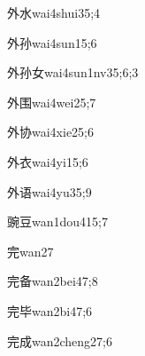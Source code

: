 \begin{verbete}{外水}{wai4shui3}{5;4}
\end{verbete}

\begin{verbete}{外孙}{wai4sun1}{5;6}
\end{verbete}

\begin{verbete}{外孙女}{wai4sun1nv3}{5;6;3}
\end{verbete}

\begin{verbete}{外围}{wai4wei2}{5;7}
\end{verbete}

\begin{verbete}{外协}{wai4xie2}{5;6}
\end{verbete}

\begin{verbete}{外衣}{wai4yi1}{5;6}
\end{verbete}

\begin{verbete}{外语}{wai4yu3}{5;9}
\end{verbete}

\begin{verbete}{豌豆}{wan1dou4}{15;7}
\end{verbete}

\begin{verbete}{完}{wan2}{7}
\end{verbete}

\begin{verbete}{完备}{wan2bei4}{7;8}
\end{verbete}

\begin{verbete}{完毕}{wan2bi4}{7;6}
\end{verbete}

\begin{verbete}{完成}{wan2cheng2}{7;6}
\end{verbete}

